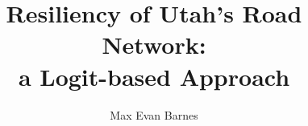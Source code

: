 \documentclass[12pt,twoside]{report}%
\begin{document}
\title{Resiliency of Utah's Road Network:\\a Logit-based Approach}%
\author{Max Evan Barnes}

\showBYUHeader







\cleardoublepage

%
%
\end{document}
